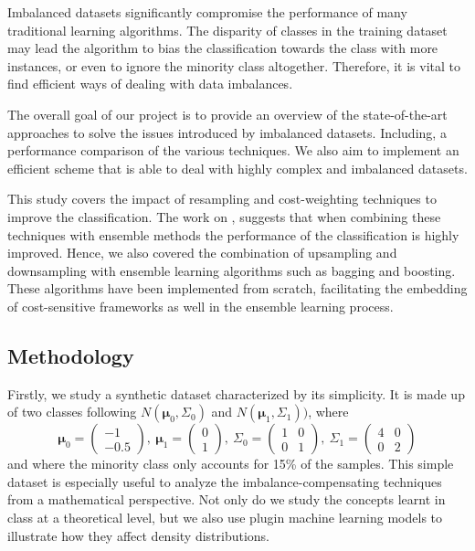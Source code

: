 \documentclass[conference]{IEEEtran}
\begin{document}
Imbalanced datasets significantly compromise the performance of many traditional learning algorithms. The disparity of classes in the training dataset may lead the algorithm to bias the classification towards the class with more instances, or even to ignore the minority class altogether. Therefore, it is vital to find efficient ways of dealing with data imbalances.

	The overall goal of our project is to provide an overview of the state-of-the-art approaches to solve the issues introduced by imbalanced datasets. Including, a performance comparison of the various techniques. We also aim to implement an efficient scheme that is able to deal with highly complex and imbalanced datasets.

This study covers the impact of resampling and cost-weighting techniques to improve the classification. The work on \cite{ensembles_review}, suggests that when combining these techniques with ensemble methods the performance of the classification is highly improved. Hence, we also covered the combination of upsampling and downsampling with ensemble learning algorithms such as bagging and boosting. These algorithms have been implemented from scratch, facilitating the embedding of cost-sensitive frameworks as well in the ensemble learning process. 

	\subsection{Methodology}
	Firstly, we study a synthetic dataset characterized by its simplicity. It is made up of two classes following $N(\boldsymbol\mu_0, \Sigma_0)$ and $N(\boldsymbol\mu_1, \Sigma_1))$, where
			\begin{equation*}
				\boldsymbol\mu_0=
				\begin{pmatrix}
					-1\\
					-0.5
				\end{pmatrix},\ %
				\boldsymbol\mu_1=
				\begin{pmatrix}
					0\\
					1
				\end{pmatrix},\ %
				\Sigma_0=
				\begin{pmatrix}
					1 & 0\\
					0 & 1
				\end{pmatrix},\ %
				\Sigma_1=
				\begin{pmatrix}
					4 & 0\\
					0 & 2
				\end{pmatrix}
			\end{equation*} and where the minority class only accounts for 15\% of the samples. This simple dataset is especially useful to analyze the imbalance-compensating techniques from a mathematical perspective. Not only do we study the concepts learnt in class at a theoretical level, but we also use plugin machine learning models to illustrate how they affect density distributions.
\end{document}
